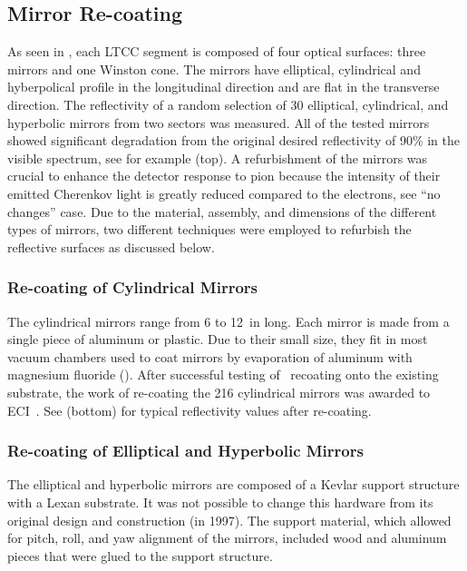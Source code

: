 \subsection{Mirror Re-coating}

As seen in , each LTCC segment is composed of four optical surfaces: three mirrors and one Winston cone.
The mirrors have elliptical, cylindrical and hyberpolical profile in the longitudinal direction and are flat in the
transverse direction.
The reflectivity of a random selection of 30 elliptical, cylindrical,
and hyperbolic mirrors from two sectors was measured. All of the tested mirrors showed significant degradation
from the original desired reflectivity of 90\% in the visible spectrum, see for example 
(top). A refurbishment of the mirrors was crucial to enhance the detector response to pion because the intensity
of their emitted  Cherenkov light is greatly reduced compared to the electrons, see 
``no changes'' case.
Due to the material, assembly, and dimensions of the different types of mirrors, two different techniques were
employed to refurbish the reflective surfaces as discussed below.

\subsubsection{Re-coating of Cylindrical Mirrors}

The cylindrical mirrors range from 6 to 12~in long. Each mirror is made from a single piece of aluminum or plastic. Due
to their small size, they fit in most vacuum chambers used to coat mirrors by evaporation of aluminum with magnesium
fluoride (\coating). After successful testing of \coating\ recoating onto the existing substrate, the work of
re-coating the 216 cylindrical mirrors was awarded to ECI~\cite{ECI}. See  (bottom)
for typical reflectivity values after re-coating.

\subsubsection{Re-coating of Elliptical and Hyperbolic Mirrors}

The elliptical and hyperbolic mirrors are composed of a Kevlar support structure with a Lexan substrate. It was not
possible to change this hardware from its original design and construction (in 1997). The support material, which allowed
for pitch, roll, and yaw alignment of the mirrors, included wood and aluminum pieces that were glued to the support
structure.

